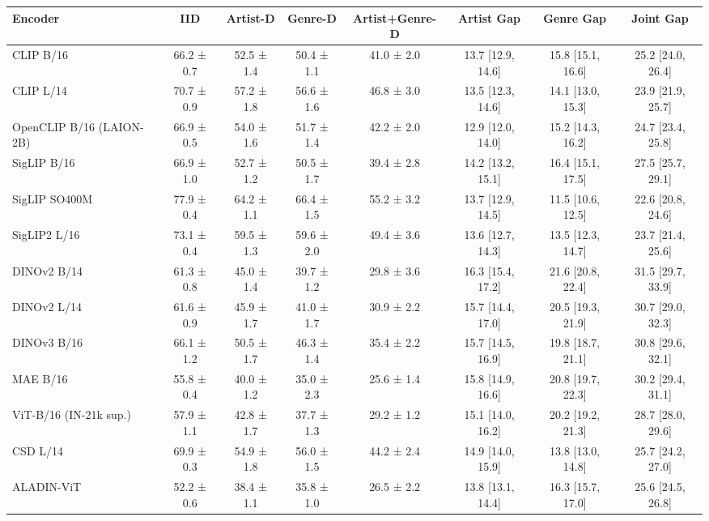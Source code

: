 \begin{tabular}{lccccccc}
\toprule
Encoder & IID & Artist-D & Genre-D & Artist+Genre-D & Artist Gap & Genre Gap & Joint Gap \\
\midrule
CLIP B/16 & 66.2 ± 0.7 & 52.5 ± 1.4 & 50.4 ± 1.1 & 41.0 ± 2.0 & 13.7 [12.9, 14.6] & 15.8 [15.1, 16.6] & 25.2 [24.0, 26.4] \\
CLIP L/14 & 70.7 ± 0.9 & 57.2 ± 1.8 & 56.6 ± 1.6 & 46.8 ± 3.0 & 13.5 [12.3, 14.6] & 14.1 [13.0, 15.3] & 23.9 [21.9, 25.7] \\
OpenCLIP B/16 (LAION-2B) & 66.9 ± 0.5 & 54.0 ± 1.6 & 51.7 ± 1.4 & 42.2 ± 2.0 & 12.9 [12.0, 14.0] & 15.2 [14.3, 16.2] & 24.7 [23.4, 25.8] \\
SigLIP B/16 & 66.9 ± 1.0 & 52.7 ± 1.2 & 50.5 ± 1.7 & 39.4 ± 2.8 & 14.2 [13.2, 15.1] & 16.4 [15.1, 17.5] & 27.5 [25.7, 29.1] \\
SigLIP SO400M & 77.9 ± 0.4 & 64.2 ± 1.1 & 66.4 ± 1.5 & 55.2 ± 3.2 & 13.7 [12.9, 14.5] & 11.5 [10.6, 12.5] & 22.6 [20.8, 24.6] \\
SigLIP2 L/16 & 73.1 ± 0.4 & 59.5 ± 1.3 & 59.6 ± 2.0 & 49.4 ± 3.6 & 13.6 [12.7, 14.3] & 13.5 [12.3, 14.7] & 23.7 [21.4, 25.6] \\
DINOv2 B/14 & 61.3 ± 0.8 & 45.0 ± 1.4 & 39.7 ± 1.2 & 29.8 ± 3.6 & 16.3 [15.4, 17.2] & 21.6 [20.8, 22.4] & 31.5 [29.7, 33.9] \\
DINOv2 L/14 & 61.6 ± 0.9 & 45.9 ± 1.7 & 41.0 ± 1.7 & 30.9 ± 2.2 & 15.7 [14.4, 17.0] & 20.5 [19.3, 21.9] & 30.7 [29.0, 32.3] \\
DINOv3 B/16 & 66.1 ± 1.2 & 50.5 ± 1.7 & 46.3 ± 1.4 & 35.4 ± 2.2 & 15.7 [14.5, 16.9] & 19.8 [18.7, 21.1] & 30.8 [29.6, 32.1] \\
MAE B/16 & 55.8 ± 0.4 & 40.0 ± 1.2 & 35.0 ± 2.3 & 25.6 ± 1.4 & 15.8 [14.9, 16.6] & 20.8 [19.7, 22.3] & 30.2 [29.4, 31.1] \\
ViT-B/16 (IN-21k sup.) & 57.9 ± 1.1 & 42.8 ± 1.7 & 37.7 ± 1.3 & 29.2 ± 1.2 & 15.1 [14.0, 16.2] & 20.2 [19.2, 21.3] & 28.7 [28.0, 29.6] \\
CSD L/14 & 69.9 ± 0.3 & 54.9 ± 1.8 & 56.0 ± 1.5 & 44.2 ± 2.4 & 14.9 [14.0, 15.9] & 13.8 [13.0, 14.8] & 25.7 [24.2, 27.0] \\
ALADIN-ViT & 52.2 ± 0.6 & 38.4 ± 1.1 & 35.8 ± 1.0 & 26.5 ± 2.2 & 13.8 [13.1, 14.4] & 16.3 [15.7, 17.0] & 25.6 [24.5, 26.8] \\
\bottomrule
\end{tabular}
